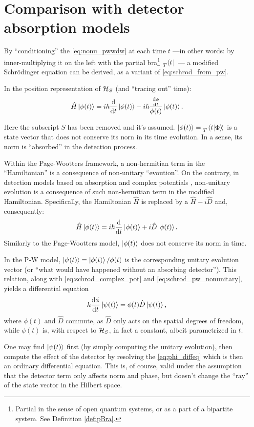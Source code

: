 \section{Comparison with detector absorption models}

By ``conditioning'' the \eqref{eq:nonu_pwwdw} at each time $t$
---in other words: by inner-multiplying it on the left with the partial bra\footnote{
  Partial in the sense of open quantum systems, or as a part of a bipartite system.
  See Definition \ref{def:pBra}.
}
$\prescript{}{T}{\bra{t}}$~---
a modified Schr{\"o}dinger equation
can be derived,
as a variant of \eqref{eq:schrod_from_pw}.

In the position representation of $\mathcal{H}_S$ (and ``tracing out'' time):
\begin{equation}\label{eq:schrod_pw_nonunitary}
  \hat{H} \ket{\phi(t)} = i\hbar\dv{t}\ket{\phi(t)} -i\hbar\frac{\dv{\phi}{t}}{\phi(t)}\ket{\phi(t)} \text{.}
\end{equation}

Here the subscript $S$ has been removed and it's assumed.
$\ket{\phi(t)} = \prescript{}{T}{\left.\left\langle t \middle| \Phi \right\rangle\!\right\rangle}$
is a state vector that does not conserve its norn in its time evolution.
In a sense, its norm is ``absorbed'' in the detection process.

Within the Page-Wootters framework, a non-hermitian term in the ``Hamiltonian''
is a consequence of non-unitary ``evoution''.
On the contrary, in detection models based on absorption and complex potentials
\parencite{RuschhauptAbsorption}, non-unitary evolution is a consequence
of such non-hermitian term in the modified Hamiltonian.
Specifically, the Hamiltonian $\hat{H}$ is replaced by a $\hat{H} - i\hat{D}$
and, consequently:
\begin{equation}\label{eq:schrod_complex_pot}
  \hat{H} \ket{\phi(t)} = i\hbar\dv{t}\ket{\phi(t)} +i\hat{D}\ket{\phi(t)} \text{.}
\end{equation}
Similarly to the Page-Wootters model, $\ket{\phi(t)}$ does not conserve its norm in time.

In the P-W model, $\ket{\psi(t)} = \ket{\phi(t)}/\phi(t)$
is the corresponding unitary evolution vector
(or ``what would have happened without an absorbing detector'').
This relation, along with \eqref{eq:schrod_complex_pot} and \eqref{eq:schrod_pw_nonunitary},
yields a differential equation
\begin{equation}\label{eq:phi_diffeq}
  \hbar\dv{\phi}{t}\ket{\psi(t)} = \phi(t) \hat{D} \ket{\psi(t)} \text{,}
\end{equation}
where $\phi(t)$ and $\hat{D}$ commute, as $\hat{D}$ only acts on the spatial degrees of freedom,
while $\phi(t)$ is, with respect to $\mathcal{H}_S$, in fact a constant, albeit parametrized in $t$.

One may find $\ket{\psi(t)}$ first (by simply computing the unitary evolution),
then compute the effect of the detector by resolving the \eqref{eq:phi_diffeq}
which is then an ordinary differential equation. This is, of course, valid
under the assumption that the detector term only affects norm and phase,
but doesn't change the ``ray'' of the state vector in the Hilbert space. 
